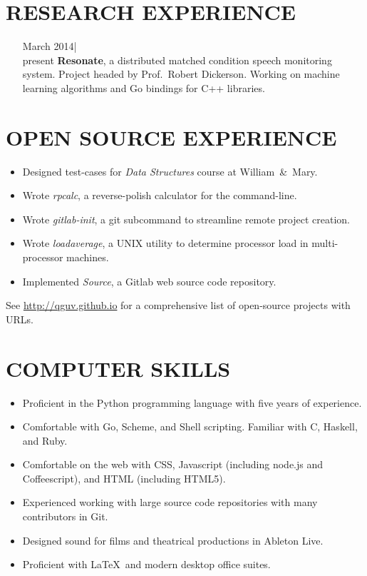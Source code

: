 \documentclass{res}
\begin{document}
\begin{resume}
\section{RESEARCH EXPERIENCE}
\vspace{5mm}
\begin{itemize}[font=\itshape,align=parleft,labelwidth=3cm,leftmargin=2cm]
    \item[March 2014|\\present]
        \textbf{Resonate}, a distributed matched condition speech monitoring system. Project headed by Prof.\ Robert Dickerson. Working on machine learning algorithms and Go bindings for C{\footnotesize ++} libraries.
\end{itemize}

\section{OPEN SOURCE EXPERIENCE}
\vspace{5mm}
\begin{itemize}[leftmargin=5mm]
\item Designed test-cases for \emph{Data Structures} course at William~\&~Mary.
\item Wrote \emph{rpcalc}, a reverse-polish calculator for the command-line.
\item Wrote \emph{gitlab-init}, a git subcommand to streamline remote project creation.
\item Wrote \emph{loadaverage}, a UNIX utility to determine processor load in multi-processor machines.
\item Implemented \emph{Source}, a Gitlab web source code repository.
\end{itemize}
    \vspace{-3mm}
    See \url{http://qguv.github.io} for a comprehensive list of open-source projects with URLs.

\section{COMPUTER SKILLS}
\vspace{5mm}
\begin{itemize}[leftmargin=5mm]
\item Proficient in the Python programming language with five years of experience.
\item Comfortable with Go, Scheme, and Shell scripting. Familiar with C, Haskell, and Ruby.
\item Comfortable on the web with CSS, Javascript (including node.js and Coffeescript), and HTML (including HTML5).
\item Experienced working with large source code repositories with many contributors in Git.
\item Designed sound for films and theatrical productions in Ableton Live.
\item Proficient with \LaTeX~and modern desktop office suites.
\end{itemize}
 

\end{resume}
\end{document}
